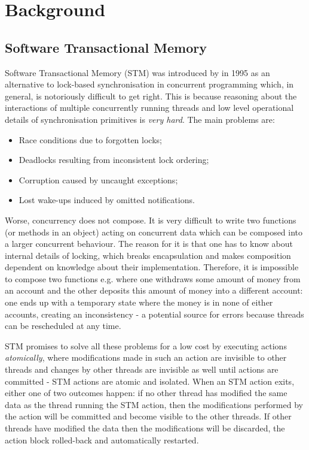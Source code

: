 \section{Background}
\label{sec:background}

\subsection{Software Transactional Memory}
Software Transactional Memory (STM) was introduced by \cite{shavit_software_1995} in 1995 as an alternative to lock-based synchronisation in concurrent programming which, in general, is notoriously difficult to get right. This is because reasoning about the interactions of multiple concurrently running threads and low level operational details of synchronisation primitives is \textit{very hard}. The main problems are:

\begin{itemize}
	\item Race conditions due to forgotten locks;
	\item Deadlocks resulting from inconsistent lock ordering;
	\item Corruption caused by uncaught exceptions;
	\item Lost wake-ups induced by omitted notifications.
\end{itemize}

Worse, concurrency does not compose. It is very difficult to write two functions (or methods in an object) acting on concurrent data which can be composed into a larger concurrent behaviour. The reason for it is that one has to know about internal details of locking, which breaks encapsulation and makes composition dependent on knowledge about their implementation. Therefore, it is impossible to compose two  functions e.g. where one withdraws some amount of money from an account and the other deposits this amount of money into a different account: one ends up with a temporary state where the money is in none of either accounts, creating an inconsistency - a potential source for errors because threads can be rescheduled at any time.

STM promises to solve all these problems for a low cost by executing actions \textit{atomically}, where modifications made in such an action are invisible to other threads and changes by other threads are invisible as well until actions are committed - STM actions are atomic and isolated. When an STM action exits, either one of two outcomes happen: if no other thread has modified the same data as the thread running the STM action, then the modifications performed by the action will be committed and become visible to the other threads. If other threads have modified the data then the modifications will be discarded, the action block rolled-back and automatically restarted.

